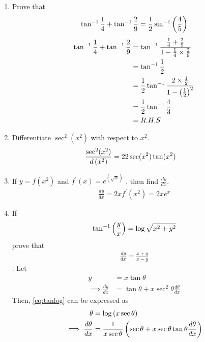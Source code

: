 \documentclass[journal,12pt,twocolumn]{IEEEtran}
\renewcommand\thesection{\arabic{section}}
\begin{document}
\begin{enumerate}[label=\thesection.\arabic*.,ref=\thesection.\theenumi]
		 

    
\item Prove that \begin{align} \tan^{-1} \frac{1}{4} + \tan^{-1} \frac{2}{9} = \frac{1}{2} \sin^{-1} \left(\frac{4}{5}\right) \nonumber \end{align}
		\solution 
		\begin{align} \tan^{-1} \frac{1}{4} + \tan^{-1} \frac{2}{9} &= \tan^{-1}\frac{\frac{1}{4}+\frac{2}{9}}{1-\frac{1}{4}\times \frac{2}{9}}
			\\
			&= \tan^{-1}\frac{1}{2}
			\\
			&= \frac{1}{2}\tan^{-1}\frac{2 \times \frac{1}{2}}{1-\left(\frac{1}{2}\right)^2}
			\\
			&= \frac{1}{2}\tan^{-1}\frac{4}{3}
			\\
			&= R.H.S
 \end{align}
 \item Differentiate $ \sec^2(x^2) $ with respect to $ x^2 $.
	 \\
	 \solution 
\begin{align} 
	\frac{\sec^2(x^2) }{d\left(x^2\right)} &=2 2 \sec(x^2) \tan(x^2)  
\end{align}
 \item If $y=f(x^2)$  and  $f^{\prime}(x)=  e^{\left(\sqrt{x}\right)}$  , then find $\frac{dy}{dx}$.\\
	 \solution 
\begin{align} 
	\frac{dy}{dx} = 2x f^{\prime}(x^2) = 2x e^{x}
\end{align}
\item If \begin{align} \tan^{-1}\left(\frac{y}{x}\right)=\log \sqrt{x^2+y^2} \nonumber \end{align}  prove that \begin{align} \frac{dy}{dx}=\frac{x+y}{x-y} \label{eq:tanlog}\end{align}.
		\solution Let 
		\begin{align}
			y &= x \tan \theta 
			\\
			\implies \frac{dy}{dx} &= \tan \theta + x \sec^2 \theta \frac{d\theta}{dx}
\label{eq:tanlog_1}
		\end{align}
		Then, \eqref{eq:tanlog} can be expressed as 
		\begin{align}
			\theta  &= \log \brak{x \sec \theta}
			\\
			\implies \frac{d\theta}{dx} &= \frac{1}{{x \sec \theta}}\brak{\sec \theta + x \sec \theta \tan \theta \frac{d\theta}{dx}}
			\\

\end{align}
\end{enumerate}
\end{document}
